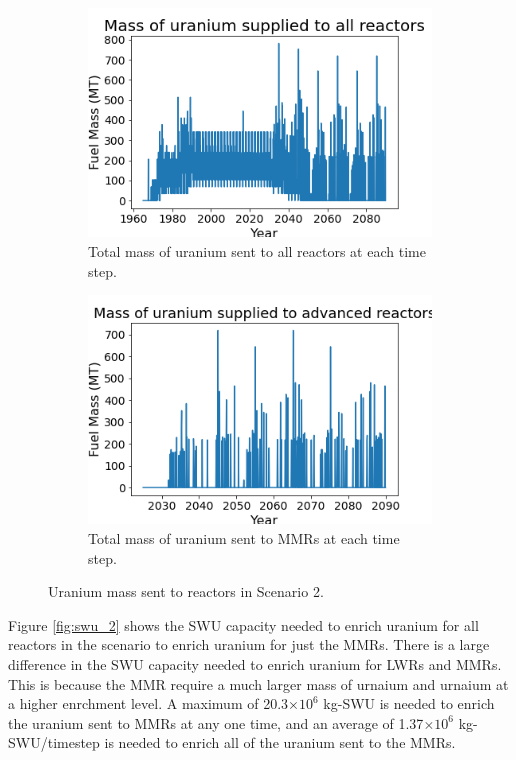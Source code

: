 \begin{figure}
    \centering
    \begin{subfigure}{0.4\textwidth}
        \centering
        \includegraphics[scale=0.3]{figures/fuelsupply_scenarios_2.png}
        \caption{Total mass of uranium sent to all reactors at each time step.}
        \label{fig:totalfuel_2}
    \end{subfigure}
    \begin{subfigure}{0.4\textwidth}
        \centering
        \includegraphics[scale=0.3]{figures/advancedRX_fuelsupply_scenarios_2.png}
        \caption{Total mass of uranium sent to \glspl{MMR} at each time step.}
        \label{fig:haleu_2}
    \end{subfigure}
    \caption{Uranium mass sent to reactors in Scenario 2.}
    \label{fig:fuel_2}
\end{figure}

Figure \ref{fig:swu_2} shows the \gls{SWU} capacity needed to 
enrich uranium for all reactors in the scenario to enrich uranium for 
just the \glspl{MMR}. There is a large difference in the \gls{SWU} 
capacity needed to enrich uranium for \glspl{LWR} and \glspl{MMR}. This 
is because the \gls{MMR} require a much larger mass of urnaium and 
urnaium at a higher enrchment level. A maximum of 20.3$\times 10^6$ kg-\gls{SWU}
is needed to enrich the uranium sent to \glspl{MMR} at any one time, and 
an average of 1.37$\times 10^6$ kg-\gls{SWU}/timestep is needed to enrich all of the 
uranium sent to the \glspl{MMR}. 


